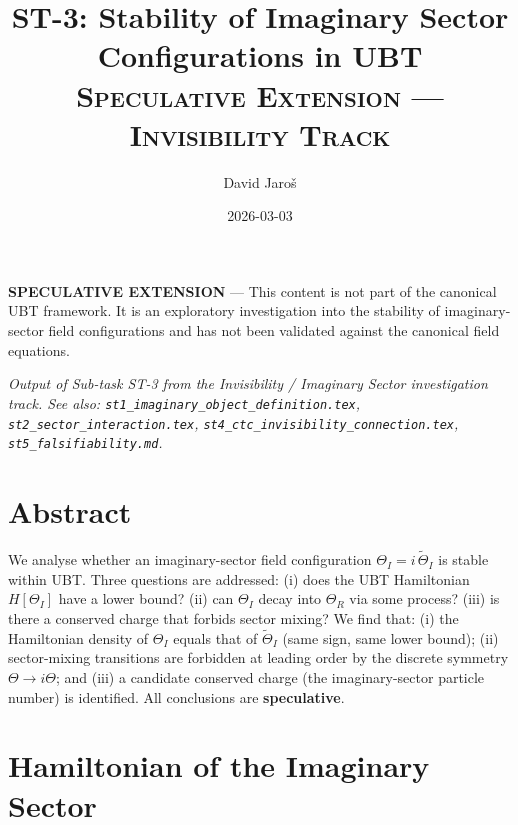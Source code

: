 \documentclass[12pt]{article}
\title{ST-3: Stability of Imaginary Sector Configurations in UBT\\[0.5em]
\large\textsc{Speculative Extension — Invisibility Track}}
\author{David Jaroš}
\date{2026-03-03}
\begin{document}
\maketitle

\begin{tcolorbox}[colback=yellow!10, title=Status]
\textbf{SPECULATIVE EXTENSION} — This content is not part of
the canonical UBT framework.  It is an exploratory investigation
into the stability of imaginary-sector field configurations and has not
been validated against the canonical field equations.
\end{tcolorbox}

\vspace{1em}
\noindent\textit{Output of Sub-task ST-3 from the Invisibility / Imaginary Sector
investigation track.  See also:
\texttt{st1\_imaginary\_object\_definition.tex},
\texttt{st2\_sector\_interaction.tex},
\texttt{st4\_ctc\_invisibility\_connection.tex},
\texttt{st5\_falsifiability.md}.}

\section*{Abstract}
We analyse whether an imaginary-sector field configuration
$\Theta_I = i\,\widetilde\Theta_I$ is stable within UBT.
Three questions are addressed:
(i) does the UBT Hamiltonian $H[\Theta_I]$ have a lower bound?
(ii) can $\Theta_I$ decay into $\Theta_R$ via some process?
(iii) is there a conserved charge that forbids sector mixing?
We find that: (i) the Hamiltonian density of $\Theta_I$ equals
that of $\widetilde\Theta_I$ (same sign, same lower bound);
(ii) sector-mixing transitions are forbidden at leading order
by the discrete symmetry $\Theta \to i\Theta$; and
(iii) a candidate conserved charge (the imaginary-sector
particle number) is identified.  All conclusions are \textbf{speculative}.

\section{Hamiltonian of the Imaginary Sector}
\end{document}
